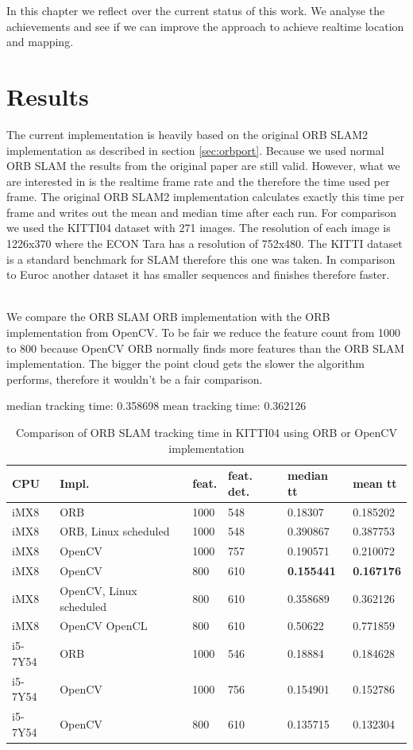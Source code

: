 \documentclass[11pt,a4paper,titlepage,oneside]{report}
\begin{document}
In this chapter we reflect over the current status of this work. We analyse the achievements and see if we can improve the approach to achieve realtime location and mapping.

\section{Results}\label{sec:results}

The current implementation is heavily based on the original ORB SLAM2 implementation as described in section \ref{sec:orbport}. Because we used normal ORB SLAM the results from the original paper are still valid. However, what we are interested in is the realtime frame rate and the therefore the time used per frame. The original ORB SLAM2 implementation calculates exactly this time per frame and writes out the mean and median time after each run. For comparison we used the KITTI04 dataset with 271 images. The resolution of each image is 1226x370 where the ECON Tara has a resolution of 752x480. The KITTI dataset is a standard benchmark for SLAM therefore this one was taken. In comparison to Euroc another dataset it has smaller sequences and finishes therefore faster.\\\

We compare the ORB SLAM ORB implementation with the ORB implementation from OpenCV. To be fair we reduce the feature count from 1000 to 800 because OpenCV ORB normally finds more features than the ORB SLAM implementation. The bigger the point cloud gets the slower the algorithm performs, therefore it wouldn't be a fair comparison.

median tracking time: 0.358698
mean tracking time: 0.362126


\begin{table}
	\begin{tabular}{  | l | l | l | l | l | l | }
		\hline
		\textbf{CPU} & \textbf{Impl.} & \textbf{feat.} & \textbf{feat. det.} & \textbf{median tt} & \textbf{mean tt} \\ \hline
		iMX8 & ORB & 1000 &  548 & 0.18307 & 0.185202 \\ \hline
		iMX8 & ORB, Linux scheduled & 1000 & 548 & 0.390867 & 0.387753 \\ \hline
		iMX8 & OpenCV & 1000 & 757 & 0.190571 & 0.210072 \\ \hline
		iMX8 & OpenCV & 800 & 610 & \textbf{0.155441} & \textbf{0.167176} \\ \hline
		iMX8 & OpenCV, Linux scheduled & 800 & 610 & 0.358689 & 0.362126 \\ \hline
		iMX8 & OpenCV OpenCL & 800 & 610 & 0.50622 & 0.771859 \\ \hline
		i5-7Y54 & ORB & 1000 & 546 & 0.18884 & 0.184628 \\ \hline
		i5-7Y54 & OpenCV & 1000 & 756 & 0.154901 & 0.152786 \\ \hline
		i5-7Y54 & OpenCV & 800 & 610 & 0.135715 & 0.132304 \\ \hline
	\end{tabular}
	\caption{Comparison of ORB SLAM tracking time in KITTI04 using ORB or OpenCV implementation}
  \label{tab:result}
\end{table}
\end{document}
